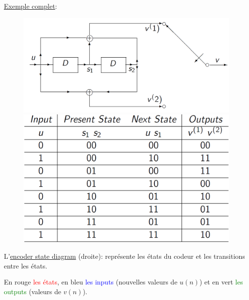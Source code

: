 \columnbreak
\underline{Exemple complet}:
\begin{figure}[H]
    \begin{minipage}{0.255\textwidth}
        \includegraphics[width=\linewidth]{images/conv_coding_diagramme_2.png}
    \end{minipage}%
    \begin{minipage}{0.255\textwidth}
        \includegraphics[width=\linewidth]{images/conv_coding_table_2.png}
    \end{minipage}
\end{figure}
L'\underline{encoder state diagram} (droite): représente les états du codeur et les transitions entre
les états.

En rouge \textcolor{red}{les états}, en bleu \textcolor{blue}{les inputs} (nouvelles
valeurs de $u(n)$) et en vert \textcolor{green}{les outputs} (valeurs de $v(n)$).

